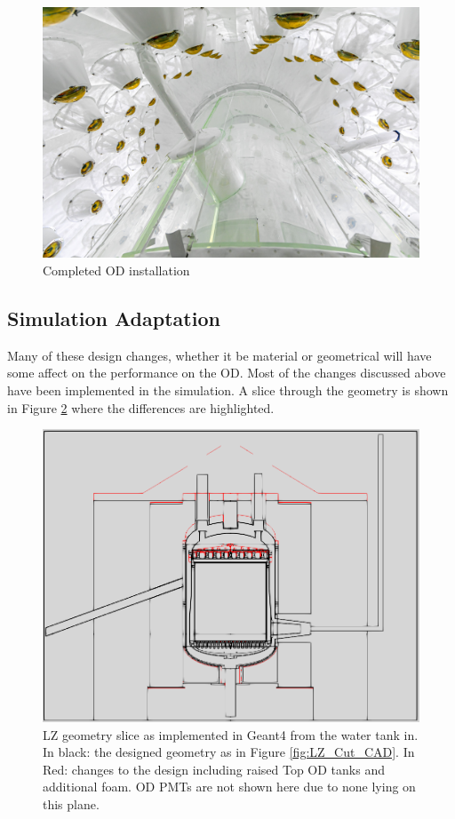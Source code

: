 \begin{figure}[!htbp]
\includegraphics[width=\textwidth]{Figures/Construction/od_complete.jpg}
\centering
\caption{Completed OD installation}
\label{fig:complete_od}
\end{figure}



\subsection{Simulation Adaptation}
\par
Many of these design changes, whether it be material or geometrical will have some affect on the performance on the OD.
Most of the changes discussed above have been implemented in the simulation.
A slice through the geometry is shown in Figure \ref{fig:Geometry_Differences} where the differences are highlighted.

\begin{figure}[!htbp]
\includegraphics[width=\textwidth]{Figures/Construction/geometry_differences.png}
\centering
\caption{LZ geometry slice as implemented in Geant4 from the water tank in. In black: the designed geometry as in Figure \ref{fig:LZ_Cut_CAD}. In Red: changes to the design including raised Top OD tanks and additional foam. OD PMTs are not shown here due to none lying on this plane.}
\label{fig:Geometry_Differences}
\end{figure}


